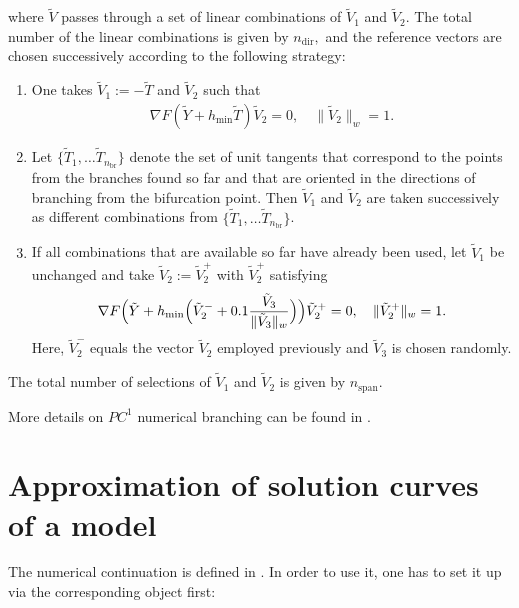 \documentclass[a4paper,11pt,english]{sphinxmanual}
\begin{document}
where \(\tilde{V}\) passes through a set of linear combinations of
\(\tilde{V}_{1}\) and \(\tilde{V}_{2}\). The total number of the linear
combinations is given by \(n_{\mathrm{dir}},\) and the reference vectors are
chosen successively according to the following strategy:
\begin{enumerate}
%
\item {} 
One takes \(\tilde{V}_{1} := -\tilde{T}\) and \(\tilde{V}_{2}\) such
that
\begin{equation*}
\begin{split}\nabla F(\tilde{Y}+h_{\mathrm{min}}\tilde{T}) \tilde{V}_{2} = 0, \quad \lVert \tilde{V}_{2} \rVert_{w} = 1.\end{split}
\end{equation*}
\item {} 
Let \(\{\tilde{T}_{1},\dotsc\tilde{T}_{n_{\mathrm{br}}}\}\) denote the
set of unit tangents that correspond to the points from the branches found so
far and that are oriented in the directions of branching from the bifurcation
point. Then \(\tilde{V}_{1}\) and \(\tilde{V}_{2}\) are taken
successively as different combinations from
\(\{\tilde{T}_{1},\dotsc\tilde{T}_{n_{\mathrm{br}}}\}\).

\item {} 
If all combinations that are available so far have already been used, let
\(\tilde{V}_{1}\) be unchanged and take
\(\tilde{V}_{2} := \tilde{V}_{2}^{+}\) with \(\tilde{V}_{2}^{+}\)
satisfying
\begin{equation*}
\begin{split}\nabla F\Bigl(\tilde{Y}+h_{\mathrm{min}}\Bigl(\tilde{V}_{2}^{-} + 0.1\frac{\tilde{V}_{3}}{\lVert \tilde{V}_{3} \rVert_{w}}\Bigr)\Bigr) \tilde{V}_{2}^{+} = 0, \quad \lVert \tilde{V}_{2}^{+} \rVert_{w} = 1.\end{split}
\end{equation*}
Here, \(\tilde{V}_{2}^{-}\) equals the vector \(\tilde{V}_{2}\)
employed previously and \(\tilde{V}_{3}\) is chosen randomly.

\end{enumerate}

The total number of selections of \(\tilde{V}_{1}\) and
\(\tilde{V}_{2}\) is given by \(n_{\mathrm{span}}\).

More details on \(PC^1\) numerical branching can be found in
.


\section{Approximation of solution curves of a model}
\label{\detokenize{userdoc/model_continuation:approximation-of-solution-curves-of-a-model}}
The numerical continuation is defined in . In
order to use it, one has to set it up via the corresponding object first:
\end{document}
